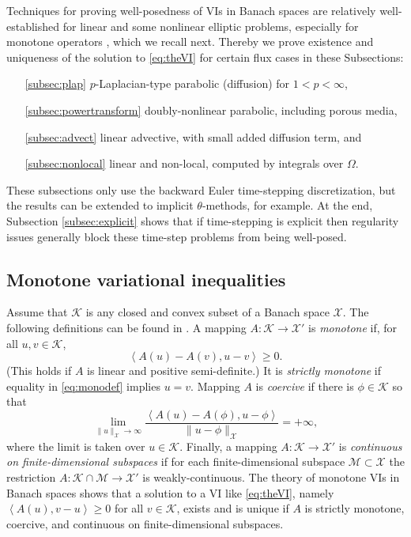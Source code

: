 \documentclass[final,onefignum]{siamart190516}
\newcommand{\ip}[2]{\ensuremath{\left<#1,#2\right>}}
\begin{document}
Techniques for proving well-posedness of VIs in Banach spaces are relatively well-established for linear and some nonlinear elliptic problems, especially for monotone operators \cite{KinderlehrerStampacchia1980}, which we recall next.  Thereby we prove existence and uniqueness of the solution to \eqref{eq:theVI} for certain flux cases in these Subsections:
\begin{itemize}
\item[\ref{subsec:plap}] $p$-Laplacian-type parabolic (diffusion) for $1<p<\infty$,
\item[\ref{subsec:powertransform}] doubly-nonlinear parabolic, including porous media,
\item[\ref{subsec:advect}] linear advective, with small added diffusion term, and
\item[\ref{subsec:nonlocal}] linear and non-local, computed by integrals over $\Omega$.
\end{itemize}
These subsections only use the backward Euler time-stepping discretization, but the results can be extended to implicit $\theta$-methods, for example.  At the end, Subsection \ref{subsec:explicit} shows that if time-stepping is explicit then regularity issues generally block these time-step problems from being well-posed.

\subsection{Monotone variational inequalities} \label{subsec:mono}  Assume that $\mathcal{K}$ is any closed and convex subset of a Banach space $\mathcal{X}$.  The following definitions can be found in \cite{KinderlehrerStampacchia1980}.  A mapping $A : \mathcal{K} \to \mathcal{X}'$ is \emph{monotone} if, for all $u,v\in\mathcal{K}$,
\begin{equation}
   \ip{A(u) - A(v)}{u-v} \ge 0.  \label{eq:monodef}
\end{equation}
(This holds if $A$ is linear and positive semi-definite.)  It is \emph{strictly monotone} if equality in \eqref{eq:monodef} implies $u=v$.  Mapping $A$ is \emph{coercive} if there is $\phi\in \mathcal{K}$ so that
\begin{equation}
   \lim_{\|u\|_{\mathcal{X}}\to\infty} \frac{\ip{A(u) - A(\phi)}{u-\phi}}{\|u-\phi\|_{\mathcal{X}}} = +\infty, \label{eq:coercivedef}
\end{equation}
where the limit is taken over $u\in\mathcal{K}$.  Finally, a mapping $A : \mathcal{K} \to \mathcal{X}'$ is \emph{continuous on finite-dimensional subspaces} if for each finite-dimensional subspace $\mathcal{M} \subset \mathcal{X}$ the restriction $A : \mathcal{K}\cap \mathcal{M} \to \mathcal{X}'$ is weakly-continuous.  The theory of monotone VIs in Banach spaces \cite[chapter III]{KinderlehrerStampacchia1980} shows that a solution to a VI like \eqref{eq:theVI}, namely $\ip{A(u)}{v-u} \ge 0$ for all $v\in\mathcal{K}$, exists and is unique if $A$ is strictly monotone, coercive, and continuous on finite-dimensional subspaces.
\end{document}
